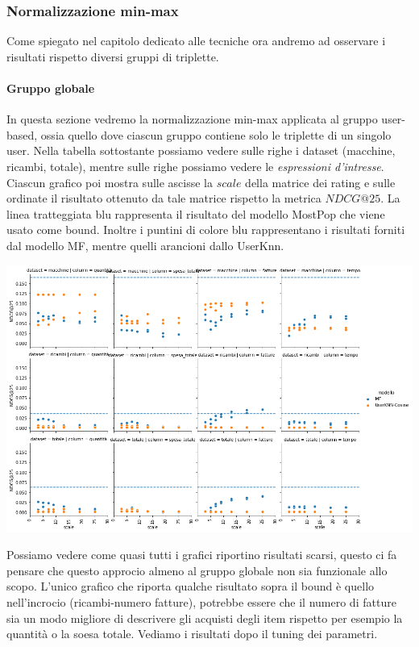 \subsubsection{Normalizzazione min-max}
Come spiegato nel capitolo dedicato alle tecniche ora andremo ad osservare i risultati rispetto diversi gruppi di triplette.

\paragraph{Gruppo globale}
In questa sezione vedremo la normalizzazione min-max applicata al gruppo user-based, ossia quello dove ciascun gruppo contiene solo le triplette di un singolo user.
Nella tabella sottostante possiamo vedere sulle righe i dataset (macchine, ricambi, totale), mentre sulle righe possiamo vedere le \textit{espressioni d'intresse}. Ciascun grafico poi mostra sulle ascisse la $scale$ della matrice dei rating e sulle ordinate il risultato ottenuto da tale matrice rispetto la metrica $NDCG@25$. La linea tratteggiata blu rappresenta il risultato del modello MostPop che viene usato come bound.
Inoltre i puntini di colore blu rappresentano i risultati forniti dal modello MF, mentre quelli arancioni dallo UserKnn.

\includegraphics[width=16cm]{figures/risultati_minmax_globale.png}

Possiamo vedere come quasi tutti i grafici riportino risultati scarsi, questo ci fa pensare che questo approcio almeno al gruppo globale non sia funzionale allo scopo.
L'unico grafico che riporta qualche risultato sopra il bound è quello nell'incrocio (ricambi-numero fatture), potrebbe essere che il numero di fatture sia un modo migliore di descrivere gli acquisti degli item rispetto per esempio la quantità o la soesa totale.
Vediamo i risultati dopo il tuning dei parametri.

